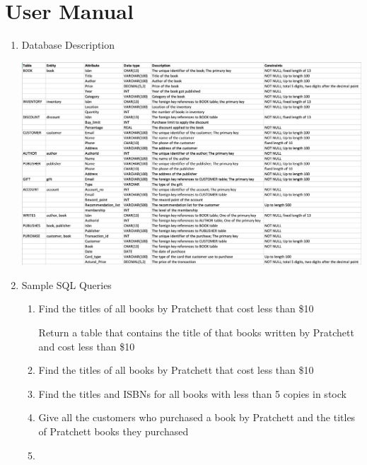\documentclass[12pt, letterpaper]{report}
\begin{document}
\section{User Manual}
\begin{enumerate}
\item Database Description

  \includegraphics[width=\linewidth]{Section2/description}

\item Sample SQL Queries

  \begin{enumerate}
  \item Find the titles of all books by Pratchett that cost less than \$10

    Return a table that contains the title of that books written by Pratchett and cost less than \$10

  \item Find the titles of all books by Pratchett that cost less than \$10

  \item Find the titles and ISBNs for all books with less than 5 copies in stock

  \item Give all the customers who purchased a book by Pratchett and the titles of Pratchett books they purchased

  \item
  \end{enumerate}
\end{enumerate}
\end{document}
